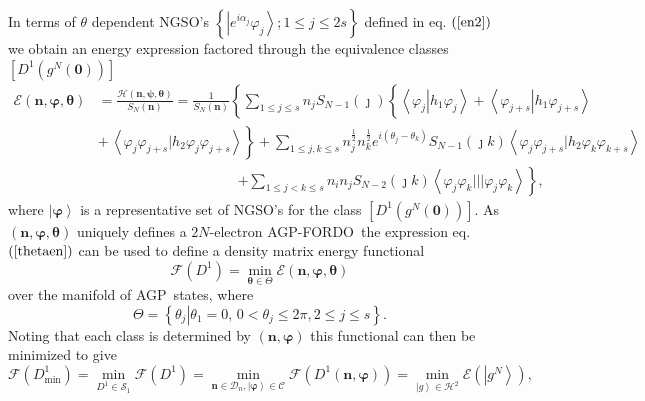 \documentclass[titlepage]{article}%
\begin{document}
In terms of $\theta$ dependent NGSO's $\left\{  \left\vert e^{i\alpha_{j}%
}\varphi_{j}\right\rangle ;1\leq j\leq2s\right\}  $ defined in eq. $\left(
\ref{en2}\right)  $ we obtain an energy expression factored through the
equivalence classes $\left[  D^{1}\left(  g^{N}\left(  \bm{0}\right)  \right)
\right]  $
\begin{align}
\mathcal{E}\left(  \bm{n},\bm{\varphi},\bm{\theta}\right)   &  =\frac
{\mathcal{H}\left(  \bm{n},\bm{\psi},\bm{\theta}\right)  }{S_{N}\left(
\bm{n}\right)  }=\frac{1}{S_{N}\left(  \bm{n}\right)  }\left\{  \sum_{1\leq
j\leq s}n_{j}S_{N-1}\left(  \jmath\right)  \left\{  \overset{}{\left\langle
\varphi_{j}\left\vert h_{1}\varphi_{j}\right.  \right\rangle +\left\langle
\varphi_{j+s}\left\vert h_{1}\varphi_{j+s}\right.  \right\rangle }\right.
\right. \nonumber\\
&  \left.  +\overset{}{\,\left\langle \varphi_{j}\varphi_{j+s}|h_{2}%
\varphi_{j}\varphi_{j+s}\right\rangle }\right\}  +\sum_{1\leq j,k\leq s}%
n_{j}^{\frac{1}{2}}n_{k}^{\frac{1}{2}}e^{i\left(  \theta_{j}-\theta
_{k}\right)  }S_{N-1}\left(  \jmath k\right)  \left\langle \varphi_{j}%
\varphi_{j+s}|h_{2}\varphi_{k}\varphi_{k+s}\right\rangle \nonumber\\
&  \qquad\qquad\qquad\qquad\qquad\left.  +\sum_{1\leq j<k\leq s}n_{i}%
n_{j}S_{N-2}\left(  \jmath k\right)  \left\langle \varphi_{j}\varphi
_{k}|||\varphi_{j}\varphi_{k}\right\rangle \right\}  , \label{thetaen}%
\end{align}
where $\left\vert \bm{\varphi}\right\rangle $ is a representative set of
NGSO's for the class $\left[  D^{1}\left(  g^{N}\left(  \bm{0}\right)
\right)  \right]  $. As $\left(  \bm{n},\bm{\varphi,\theta}\right)  $ uniquely
defines a $2N$-electron AGP-FORDO\ the expression eq. $\left(  \ref{thetaen}%
\right)  $ can be used to define a density matrix energy functional
\begin{equation}
\mathcal{F}\left(  D^{1}\right)  =\min_{\bm{\theta\in}\Theta}\mathcal{E}%
\left(  \bm{n},\bm{\varphi},\bm{\theta}\right)
\end{equation}
over the manifold of AGP\ states, where
\begin{equation}
\Theta=\left\{  \left.  \theta_{j}\right\vert \theta_{1}=0,\,0<\theta_{j}%
\leq2\pi,2\leq j\leq s\right\}  .
\end{equation}
Noting that each class is determined by $\left(  \bm{n},\bm{\varphi
}\right)  $ this functional can then be minimized to give
\begin{equation}
\mathcal{F}\left(  D_{\min}^{1}\right)  =\min_{D^{1}\in\mathcal{S}_{1}%
}\mathcal{F}\left(  D^{1}\right)  =\min_{\bm{n\in}\mathcal{D}_{n},\left\vert
\bm{\varphi}\right\rangle \in\mathcal{C}}\mathcal{F}\left(  D^{1}\left(
\bm{n},\bm{\varphi}\right)  \right)  =\min_{\left\vert g\right\rangle
\in\mathcal{H}^{2}}\mathcal{E}\left(  \left\vert g^{N}\right\rangle \right)  ,
\label{MinDMF}%
\end{equation}
\end{document}
